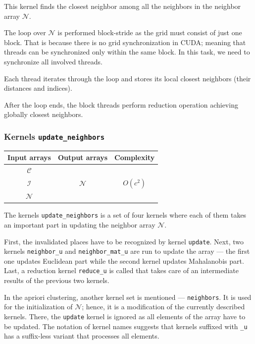 This kernel finds the closest neighbor among all the neighbors in the neighbor array $\mathcal{N}$.

The loop over $\mathcal{N}$ is performed block-stride as the grid must consist of just one block. That is because there is no grid synchronization in CUDA; meaning that threads can be synchronized only within the same block. In this task, we need to synchronize all involved threads.

Each thread iterates through the loop and stores its local closest neighbors (their distances and indices).

After the loop ends, the block threads perform reduction operation achieving globally closest neighbors.

\subsubsection{Kernels \texttt{update\_neighbors}}

\begin{table}[h]
	\centering
	\begin{tabular}{ccc}
		\toprule
		\textbf{Input arrays} & \textbf{Output arrays} & \textbf{Complexity} \\ \midrule
		$\mathcal{C}$     &                        &                     \\
		$\mathcal{I}$     &     $\mathcal{N}$      &       $O(c^2)$        \\
		$\mathcal{N}$     &                        &                     \\ \bottomrule
	\end{tabular}
\end{table}

The kernels \texttt{update\_neighbors} is a set of four kernels where each of them takes an important part in updating the neighbor array $\mathcal{N}$.

First, the invalidated places have to be recognized by kernel \texttt{update}. Next, two kernels \texttt{neighbor\_u} and \texttt{neighbor\_mat\_u} are run to update the array --- the first one updates Euclidean part while the second kernel updates Mahalanobis part. Last, a reduction kernel \texttt{reduce\_u} is called that takes care of an intermediate results of the previous two kernels.

In the apriori clustering, another kernel set is mentioned ---  \texttt{neighbors}. It is used for the initialization of $\mathcal{N}$; hence, it is a modification of the currently described kernels. There, the \texttt{update} kernel is ignored as all elements of the array have to be updated. The notation of kernel names suggests that kernels suffixed with \texttt{\_u} has a suffix-less variant that processes all elements.

